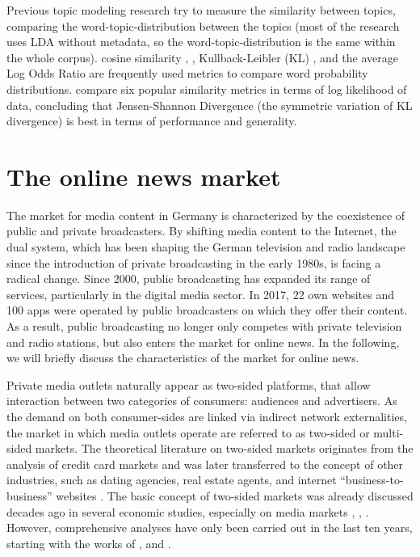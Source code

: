 \documentclass[12pt,a4paper,notitlepage]{article}
\begin{document}
\begin{enumerate}
\begin{enumerate}
		Previous topic modeling research try to measure the similarity between topics, comparing the word-topic-distribution between the topics (most of the research uses LDA without metadata, so the word-topic-distribution is the same within the whole corpus). cosine similarity \citep{he_detecting_2009}, \citep{ramage_labeled_2009}, Kullback-Leibler (KL) \citep{newman_distributed_2009}, \citep{wang_mining_2009} and the average Log Odds Ratio \citep{chaney_visualizing_2012} are frequently used metrics to compare word probability distributions. \citet{kim_topic_2011} compare six popular similarity metrics in terms of log likelihood of data, concluding that Jensen-Shannon Divergence (the symmetric variation of KL divergence) is best in terms of performance and generality. 
		
		\end{enumerate}
	
\end{enumerate}


\section{The online news market}\label{ch_onlinenews}

The market for media content in Germany is characterized by the coexistence of public and private broadcasters. By shifting media content to the Internet, the dual system, which has been shaping the German television and radio landscape since the introduction of private broadcasting in the early 1980s, is facing a radical change. Since 2000, public broadcasting has expanded its range of services, particularly in the digital media sector. In 2017, 22 own websites and 100 apps were operated by public broadcasters on which they offer their content. As a result, public broadcasting no longer only competes with private television and radio stations, but also enters the market for online news. In the following, we will briefly discuss the characteristics of the market for online news. 

Private media outlets naturally appear as two-sided platforms, that allow interaction between two categories of consumers: audiences and advertisers. As the demand on both consumer-sides are linked via indirect network externalities, the market in which media outlets operate are referred to as two-sided or multi-sided markets. The theoretical literature on two-sided markets originates from the analysis of credit card markets \citep{rochet_platform_2003} and was later transferred to the concept of other industries, such as dating agencies, real estate agents, and internet “business-to-business” websites \citep{caillaud_chicken_2003}. The basic concept of two-sided markets was already discussed decades ago in several economic studies, especially on media markets \citep{corden_maximisation_1952}, \citep{gustafsson_circulation_1978}, \citep{blair_pricing_1993}. However, comprehensive analyses have only been carried out in the last ten years, starting with the works of \citet{rochet_platform_2003}, \citet{evans_empirical_2003} and \citet{armstrong_competition_2006}.
\end{document}
